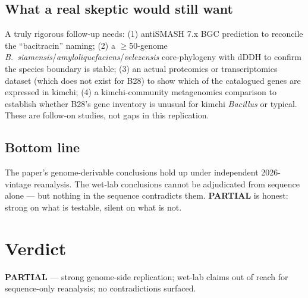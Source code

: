 \documentclass[11pt]{article}
\begin{document}
\subsection*{What a real skeptic would still want}
A truly rigorous follow-up needs: (1) antiSMASH 7.x BGC prediction to reconcile the ``bacitracin'' naming; (2) a $\geq$50-genome \textit{B.\ siamensis}/\textit{amyloliquefaciens}/\textit{velezensis} core-phylogeny with dDDH to confirm the species boundary is stable; (3) an actual proteomics or transcriptomics dataset (which does not exist for B28) to show which of the catalogued genes are expressed in kimchi; (4) a kimchi-community metagenomics comparison to establish whether B28's gene inventory is unusual for kimchi \textit{Bacillus} or typical. These are follow-on studies, not gaps in this replication.

\subsection*{Bottom line}
The paper's genome-derivable conclusions hold up under independent 2026-vintage reanalysis. The wet-lab conclusions cannot be adjudicated from sequence alone --- but nothing in the sequence contradicts them. \textbf{PARTIAL} is honest: strong on what is testable, silent on what is not.

\section{Verdict}
\textbf{PARTIAL} --- strong genome-side replication; wet-lab claims out of reach for sequence-only reanalysis; no contradictions surfaced.
\end{document}
